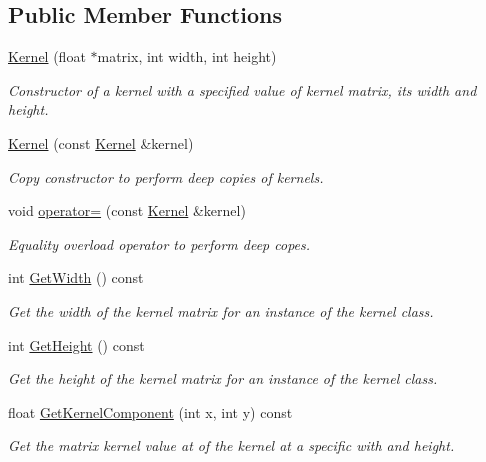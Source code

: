 \subsection*{Public Member Functions}
\begin{DoxyCompactItemize}
\item 
\hyperlink{classKernel_a3fc050cfe592b98f4c53fb4433f33856}{Kernel} (float $\ast$matrix, int width, int height)
\begin{DoxyCompactList}\small\item\em Constructor of a kernel with a specified value of kernel matrix, its width and height. \end{DoxyCompactList}\item 
\mbox{\label{classKernel_ab12b6207cde6479e1a9f1f09b4decb6d}} 
\hyperlink{classKernel_ab12b6207cde6479e1a9f1f09b4decb6d}{Kernel} (const \hyperlink{classKernel}{Kernel} \&kernel)
\begin{DoxyCompactList}\small\item\em Copy constructor to perform deep copies of kernels. \end{DoxyCompactList}\item 
void \hyperlink{classKernel_a82c66f7c3d498d40dbab93e81fd94402}{operator=} (const \hyperlink{classKernel}{Kernel} \&kernel)
\begin{DoxyCompactList}\small\item\em Equality overload operator to perform deep copes. \end{DoxyCompactList}\item 
int \hyperlink{classKernel_af7579694a64547d0fa3191a1989674c9}{Get\+Width} () const
\begin{DoxyCompactList}\small\item\em Get the width of the kernel matrix for an instance of the kernel class. \end{DoxyCompactList}\item 
int \hyperlink{classKernel_a9130c92e4b917325b6eb45856913e8ff}{Get\+Height} () const
\begin{DoxyCompactList}\small\item\em Get the height of the kernel matrix for an instance of the kernel class. \end{DoxyCompactList}\item 
float \hyperlink{classKernel_a104461ffa063598341e8a149a6465acd}{Get\+Kernel\+Component} (int x, int y) const
\begin{DoxyCompactList}\small\item\em Get the matrix kernel value at of the kernel at a specific with and height. \end{DoxyCompactList}\end{DoxyCompactItemize}


